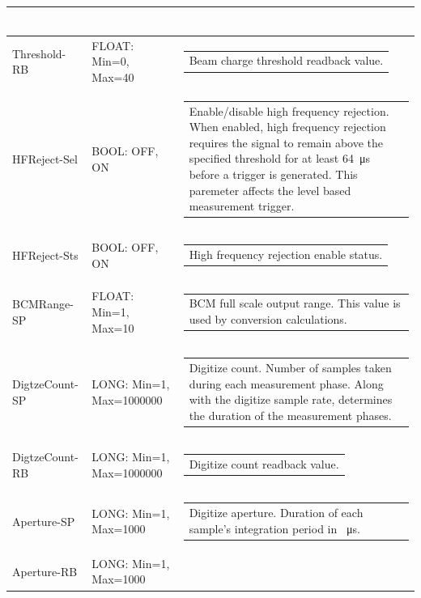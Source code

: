 \documentclass[openany]{article}
\begin{document}
\begin{longtable}{| m{3.0cm} m{4.5cm} m{7.0cm} |}
\begin{tabular}{@{}m{6cm}@{}}
						\end{tabular} \\ \hline
		Threshold-RB & FLOAT: Min=0, Max=40 & \begin{tabular}{@{}m{6cm}@{}}
	    					Beam charge threshold readback value.
						\end{tabular} \\ \hline
		HFReject-Sel & BOOL: OFF, ON & \begin{tabular}{@{}m{6cm}@{}}
	    					Enable/disable high frequency rejection. When enabled, high frequency rejection requires the signal to remain above the specified threshold for at least \SI{64}{\micro\second} before a trigger is generated. This paremeter affects the level based measurement trigger.
						\end{tabular} \\ \hline
		HFReject-Sts & BOOL: OFF, ON & \begin{tabular}{@{}m{6cm}@{}}
	    					High frequency rejection enable status.
						\end{tabular} \\ \hline
		BCMRange-SP & FLOAT: Min=1, Max=10 & \begin{tabular}{@{}m{6cm}@{}}
	    					BCM full scale output range. This value is used by conversion calculations.
						\end{tabular} \\ \hline
		DigtzeCount-SP & LONG: Min=1, Max=1000000 & \begin{tabular}{@{}m{6cm}@{}}
	    					Digitize count. Number of samples taken during each measurement phase. Along with the digitize sample rate, determines the duration of the measurement phases.
						\end{tabular} \\ \hline
		DigtzeCount-RB & LONG: Min=1, Max=1000000 & \begin{tabular}{@{}m{6cm}@{}}
	    					Digitize count readback value.
						\end{tabular} \\ \hline
		Aperture-SP & LONG: Min=1, Max=1000 & \begin{tabular}{@{}m{6cm}@{}}
	    					Digitize aperture. Duration of each sample's integration period in \SI{}{\micro\second}.
						\end{tabular} \\ \hline
		Aperture-RB & LONG: Min=1, Max=1000 & \begin{tabular}{@{}m{6cm}@{}}

\end{tabular}
\end{longtable}
\end{document}
